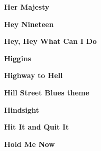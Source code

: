 \newline
\vspace{10pt} 
\begin{center}\textbf{Her Majesty}\end{center}
\newline
\vspace{10pt} 
\begin{center}\textbf{Hey Nineteen}\end{center}
\newline
\vspace{10pt} 
\begin{center}\textbf{Hey, Hey What Can I Do}\end{center}
\newline
\vspace{10pt} 
\begin{center}\textbf{Higgins}\end{center}
\newline
\vspace{10pt} 
\begin{center}\textbf{Highway to Hell}\end{center}
\newline
\vspace{10pt} 
\begin{center}\textbf{Hill Street Blues theme}\end{center}
\newline
\vspace{10pt} 
\begin{center}\textbf{Hindsight}\end{center}
\newline
\vspace{10pt} 
\begin{center}\textbf{Hit It and Quit It}\end{center}
\newline
\vspace{10pt} 
\begin{center}\textbf{Hold Me Now}\end{center}
\newline
\vspace{10pt} 
